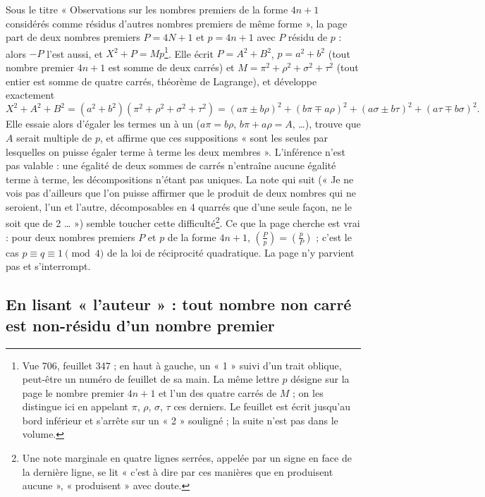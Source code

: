 \documentclass[11pt,a4paper]{article}
\begin{document}
Sous le titre « Observations sur les nombres premiers de la forme $4n+1$ considérés comme résidus d'autres nombres premiers de même forme », la page part de deux nombres premiers $P=4N+1$ et $p=4n+1$ avec $P$ résidu de $p$ : alors $-P$ l'est aussi, et $X^2+P=Mp$\footnote{Vue 706, feuillet 347 ; en haut à gauche, un « 1 » suivi d'un trait oblique, peut-être un numéro de feuillet de sa main. La même lettre $p$ désigne sur la page le nombre premier $4n+1$ et l'un des quatre carrés de $M$ ; on les distingue ici en appelant $\pi$, $\rho$, $\sigma$, $\tau$ ces derniers. Le feuillet est écrit jusqu'au bord inférieur et s'arrête sur un « 2 » souligné ; la suite n'est pas dans le volume.}. Elle écrit $P=A^2+B^2$, $p=a^2+b^2$ (tout nombre premier $4n+1$ est somme de deux carrés) et $M=\pi^2+\rho^2+\sigma^2+\tau^2$ (tout entier est somme de quatre carrés, théorème de Lagrange), et développe exactement
\[ X^2+A^2+B^2=(a^2+b^2)(\pi^2+\rho^2+\sigma^2+\tau^2)=(a\pi\pm b\rho)^2+(b\pi\mp a\rho)^2+(a\sigma\pm b\tau)^2+(a\tau\mp b\sigma)^2. \]
Elle essaie alors d'égaler les termes un à un ($a\pi=b\rho$, $b\pi+a\rho=A$, …), trouve que $A$ serait multiple de $p$, et affirme que ces suppositions « sont les seules par lesquelles on puisse égaler terme à terme les deux membres ». L'inférence n'est pas valable : une égalité de deux sommes de carrés n'entraîne aucune égalité terme à terme, les décompositions n'étant pas uniques. La note qui suit (« Je ne vois pas d'ailleurs que l'on puisse affirmer que le produit de deux nombres qui ne seroient, l'un et l'autre, décomposables en 4 quarrés que d'une seule façon, ne le soit que de 2 … ») semble toucher cette difficulté\footnote{Une note marginale en quatre lignes serrées, appelée par un signe en face de la dernière ligne, se lit « c'est à dire par ces manières que en produisent aucune », « produisent » avec doute.}. Ce que la page cherche est vrai : pour deux nombres premiers $P$ et $p$ de la forme $4n+1$, $\left(\frac{P}{p}\right)=\left(\frac{p}{P}\right)$ ; c'est le cas $p\equiv q\equiv 1\pmod 4$ de la loi de réciprocité quadratique. La page n'y parvient pas et s'interrompt.

\subsection*{En lisant « l'auteur » : tout nombre non carré est non-résidu d'un nombre premier}
\end{document}
